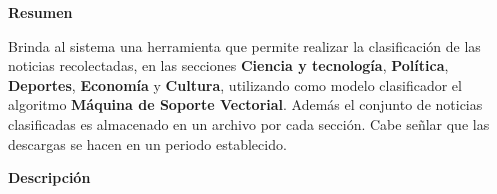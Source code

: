 
\begin{large}
	\textbf{Resumen}\\
\end{large}

Brinda al sistema una herramienta que permite realizar la clasificación de las noticias recolectadas, en las secciones \textbf{Ciencia y tecnología}, \textbf{Política}, \textbf{Deportes}, \textbf{Economía} y  \textbf{Cultura}, utilizando como modelo clasificador el algoritmo \textbf{Máquina de Soporte Vectorial}. Además el conjunto de noticias clasificadas es almacenado en un archivo por cada sección. Cabe señlar que las descargas se hacen en un periodo establecido.\\


\begin{large}
	\textbf{Descripción}\\
\end{large} 



